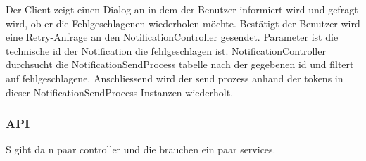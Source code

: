 Der Client zeigt einen Dialog an in dem der Benutzer informiert wird und gefragt wird, ob er die Fehlgeschlagenen wiederholen möchte.
Bestätigt der Benutzer wird eine Retry-Anfrage an den NotificationController gesendet.
Parameter ist die technische id der Notification die fehlgeschlagen ist.
NotificationController durchsucht die NotificationSendProcess tabelle nach der gegebenen id und filtert auf fehlgeschlagene.
Anschliessend wird der send prozess anhand der tokens in dieser NotificationSendProcess Instanzen wiederholt.


\clearpage

\subsubsection{API}

S gibt da n paar controller und die brauchen ein paar services.
